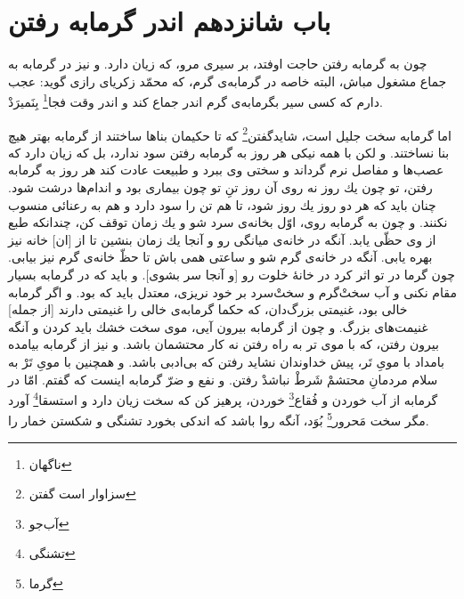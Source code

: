 \section*{باب شانزدهم
اندر گرمابه رفتن}

چون به گرمابه رفتن حاجت اوفتد، بر سيرى مرو، كه زيان دارد. و نيز در گرمابه به جماع مشغول مباش، البته خاصه در گرمابه‌ی گرم، كه محمّد زكرياى رازى گويد: عجب دارم كه كسى سير بگرمابه‌ی گرم اندر جماع كند و اندر وقت فجا\footnote{ناگهان} بِنَميرَدْ.

اما گرمابه سخت جليل است، شايدگفتن\footnote{سزاوار است گفتن} كه تا حكيمان بناها ساختند از گرمابه بهتر هيچ بنا نساختند. و لكن با همه نيكى هر روز به گرمابه رفتن سود ندارد، بل كه زيان دارد كه عصب‌ها و مفاصل نرم گرداند و سختى وى ببرد و طبيعت عادت كند هر روز به گرمابه رفتن، تو چون يك روز نه روى آن روز  تنِ تو چون بيمارى بود و اندام‌ها درشت شود. چنان بايد كه هر دو روز يك روز شود، تا هم تن را سود دارد و هم به رعنائى منسوب نكنند. و چون به گرمابه روى، اوّل بخانه‌ی سرد شو و يك زمان توقف كن، چندانكه طبع از وى حظّى يابد. آنگه در خانه‌ی ميانگى رو و آنجا يك زمان بنشين تا از [ان] خانه نيز بهره يابى. آنگه در خانه‌ی گرم شو و ساعتى همى باش تا حظّ خانه‌ی گرم نيز بيابى. چون گرما در تو اثر كرد در خانۀ خلوت رو [و آنجا سر بشوى]. و بايد كه در گرمابه بسيار مقام نكنى و آب سخت‌ْگرم و سخت‌ْسرد بر خود نريزى، معتدل بايد كه بود. و اگر گرمابه خالى بود، غنيمتى بزرگ‌دان، كه حكما گرمابه‌ی خالى را غنيمتى دارند [از جمله] غنيمت‌هاى بزرگ. و چون از گرمابه بيرون آيى، موى سخت خشك بايد كردن و آنگه بيرون رفتن، كه با موى تر به راه رفتن نه كار محتشمان باشد. و نيز از گرمابه بيامده بامداد با موىِ تَر، پيش خداوندان نشايد رفتن كه بى‌ادبى باشد. و همچنين با موىِ تَرْ به سلام مردمانِ محتشمْ شَرطْ نباشدْ رفتن. و نفع و ضرّ گرمابه اينست كه گفتم. امّا در گرمابه از آب خوردن و فُقاع\footnote{آب‌جو} خوردن، پرهيز كن كه سخت زيان دارد و استسقا\footnote{تشنگی} آورد مگر سخت مَحرور\footnote{گرما} بُوَد، آنگه روا باشد كه اندكى بخورد تشنگى و شكستن خمار را.






















\newpage
